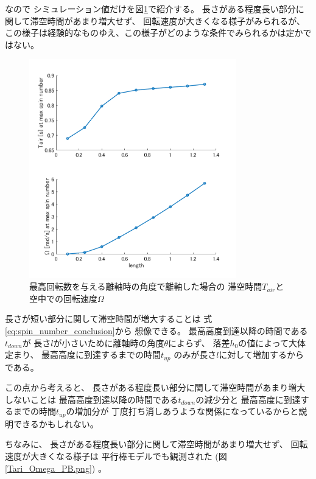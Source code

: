\documentclass[a4paper,11pt]{jsarticle}
\begin{document}
なので
シミュレーション値だけを図\ref{Tair_Omega_at_maxspin.png}で紹介する。
長さがある程度長い部分に関して滞空時間があまり増大せず、
回転速度が大きくなる様子がみられるが、
この様子は経験的なものゆえ、この様子がどのような条件でみられるかは定かではない。

\begin{figure}[h]
  \centering
  \includegraphics[width = 0.8\textwidth]{Tair_Omega_at_maxspin.png}
  \caption{
    最高回転数を与える離軸時の角度で離軸した場合の
    滞空時間$T_{air}$と
    空中での回転速度$\Omega$
  }
  \label{Tair_Omega_at_maxspin.png}
\end{figure}

長さが短い部分に関して滞空時間が増大することは
式\ref{eq:spin_number_conclusion}から
想像できる。
最高高度到達以降の時間である$t_{down}$が
長さ$l$が小さいために離軸時の角度$\theta$によらず、
落差$h_0$の値によって大体定まり、
最高高度に到達するまでの時間$t_{up}$
のみが長さ$l$に対して増加するからである。

この点から考えると、
長さがある程度長い部分に関して滞空時間があまり増大しないことは
最高高度到達以降の時間である$t_{down}$の減少分と
最高高度に到達するまでの時間$t_{up}$の増加分が
丁度打ち消しあうような関係になっているからと説明できるかもしれない。

ちなみに、
長さがある程度長い部分に関して滞空時間があまり増大せず、
回転速度が大きくなる様子は
平行棒モデルでも観測された
(図\ref{Tari_Omega_PB.png})
。
\end{document}
